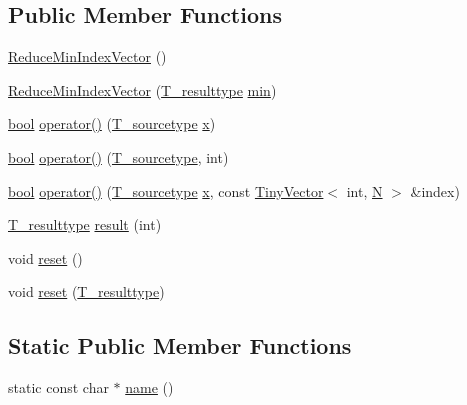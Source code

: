 \subsection*{Public Member Functions}
\begin{DoxyCompactItemize}
\item 
\hyperlink{classReduceMinIndexVector_aa14ce0a1a8046e431338b7073677fcae}{Reduce\+Min\+Index\+Vector} ()
\item 
\hyperlink{classReduceMinIndexVector_a5f68c7341d4f3420094623615a8db121}{Reduce\+Min\+Index\+Vector} (\hyperlink{classReduceMinIndexVector_a2e7c894a95020e5638affc6f1c8a4e50}{T\+\_\+resulttype} \hyperlink{vecbfn_8cc_aa3e27e02424d28adfcf9d2b934e741a1}{min})
\item 
\hyperlink{compiler_8h_abb452686968e48b67397da5f97445f5b}{bool} \hyperlink{classReduceMinIndexVector_a21f531e052e77b6d6bbc7c8055ab62c0}{operator()} (\hyperlink{classReduceMinIndexVector_a65030b49259be23f83d7a2714e93f502}{T\+\_\+sourcetype} \hyperlink{vecnorm1_8cc_ac73eed9e41ec09d58f112f06c2d6cb63}{x})
\item 
\hyperlink{compiler_8h_abb452686968e48b67397da5f97445f5b}{bool} \hyperlink{classReduceMinIndexVector_a6e32fa9dc2006364e9e64ce990cf753e}{operator()} (\hyperlink{classReduceMinIndexVector_a65030b49259be23f83d7a2714e93f502}{T\+\_\+sourcetype}, int)
\item 
\hyperlink{compiler_8h_abb452686968e48b67397da5f97445f5b}{bool} \hyperlink{classReduceMinIndexVector_aec28f1d65e40c00a3f54b5252c75dddf}{operator()} (\hyperlink{classReduceMinIndexVector_a65030b49259be23f83d7a2714e93f502}{T\+\_\+sourcetype} \hyperlink{vecnorm1_8cc_ac73eed9e41ec09d58f112f06c2d6cb63}{x}, const \hyperlink{classTinyVector}{Tiny\+Vector}$<$ int, \hyperlink{polmisc_8c_a0240ac851181b84ac374872dc5434ee4}{N} $>$ \&index)
\item 
\hyperlink{classReduceMinIndexVector_a2e7c894a95020e5638affc6f1c8a4e50}{T\+\_\+resulttype} \hyperlink{classReduceMinIndexVector_a3de030dfcf37d8652a5bf3755f0b5066}{result} (int)
\item 
void \hyperlink{classReduceMinIndexVector_a921d18a38d471cd6ec7cc239fa4b22ad}{reset} ()
\item 
void \hyperlink{classReduceMinIndexVector_a3f8089b05a666bd2be55f8fa96fb6078}{reset} (\hyperlink{classReduceMinIndexVector_a2e7c894a95020e5638affc6f1c8a4e50}{T\+\_\+resulttype})
\end{DoxyCompactItemize}
\subsection*{Static Public Member Functions}
\begin{DoxyCompactItemize}
\item 
static const char $\ast$ \hyperlink{classReduceMinIndexVector_a759deac5cc95fdf792f69e31a3ef22e3}{name} ()
\end{DoxyCompactItemize}
